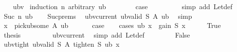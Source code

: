 \begin{isabellebody}
%
\isadelimproof
\ \ %
\endisadelimproof
%
\isatagproof
{}\isamarkupfalse%
\ ubv\isanewline
{}\isamarkupfalse%
\ {\isacharparenleft}{\kern0pt}induction\ n\ arbitrary{\isacharcolon}{\kern0pt}\ ub{\isacharparenright}{\kern0pt}\isanewline
\ \ \isamarkupfalse%
\ {}\isanewline
\ \ \isamarkupfalse%
\ {\isacharquery}{\kern0pt}case\ \isanewline
\ \ \ \ \isamarkupfalse%
\ {}\ \isamarkupfalse%
\ {\isacharparenleft}{\kern0pt}simp\ add{\isacharcolon}{\kern0pt}\ Let{\isacharunderscore}{\kern0pt}def{\isacharparenright}{\kern0pt}\isanewline
{}\isamarkupfalse%
\isanewline
\ \ \isamarkupfalse%
\ {\isacharparenleft}{\kern0pt}Suc\ n\ ub{\isacharparenright}{\kern0pt}\isanewline
\ \ \isamarkupfalse%
\ Suc{\isachardot}{\kern0pt}prems\ \isamarkupfalse%
\ ubv{\isacharunderscore}{\kern0pt}current{\isacharcolon}{\kern0pt}\ {\isachardoublequoteopen}ub{\isacharunderscore}{\kern0pt}valid\ S\ A\ ub{\isachardoublequoteclose}\ \isamarkupfalse%
\ simp\isanewline
\ \ \isanewline
\ \ \isamarkupfalse%
\ {\isacharquery}{\kern0pt}x\ {\isacharequal}{\kern0pt}\ {\isachardoublequoteopen}pick{\isacharunderscore}{\kern0pt}ub{\isacharunderscore}{\kern0pt}some\ A\ ub{\isachardoublequoteclose}\isanewline
\ \ \isanewline
\ \ \isamarkupfalse%
\ {\isacharquery}{\kern0pt}case\isanewline
\ \ \isamarkupfalse%
\ {\isacharparenleft}{\kern0pt}cases\ {\isachardoublequoteopen}ub\ {\isacharquery}{\kern0pt}x\ {\isacharequal}{\kern0pt}\ gain\ S\ {\isacharquery}{\kern0pt}x{\isachardoublequoteclose}{\isacharparenright}{\kern0pt}\isanewline
\ \ \ \ \isamarkupfalse%
\ True\isanewline
\ \ \ \ \isamarkupfalse%
\ \isamarkupfalse%
\ {\isacharquery}{\kern0pt}thesis\ \isanewline
\ \ \ \ \ \ \isamarkupfalse%
\ ubv{\isacharunderscore}{\kern0pt}current\ \isamarkupfalse%
\ {\isacharparenleft}{\kern0pt}simp\ add{\isacharcolon}{\kern0pt}\ Let{\isacharunderscore}{\kern0pt}def{\isacharparenright}{\kern0pt}\isanewline
\ \ \isamarkupfalse%
\isanewline
\ \ \ \ \isamarkupfalse%
\ False\isanewline
\ \ \ \ \isamarkupfalse%
\ ubv{\isacharunderscore}{\kern0pt}tight{\isacharcolon}{\kern0pt}\ {\isachardoublequoteopen}ub{\isacharunderscore}{\kern0pt}valid\ S\ A\ {\isacharparenleft}{\kern0pt}tighten\ S\ ub\ {\isacharquery}{\kern0pt}x{\isacharparenright}{\kern0pt}{\isachardoublequoteclose}\isanewline

\end{isabellebody}
